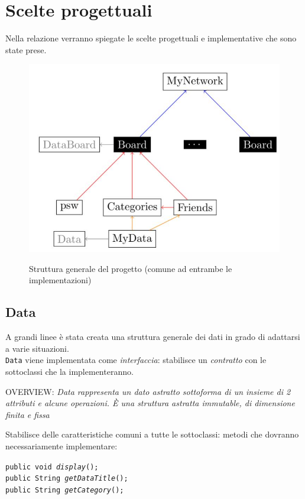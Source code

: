 \documentclass[10pt, a4paper]{article}
\begin{document}
\clearpage

\section{Scelte progettuali}
Nella relazione verranno spiegate le scelte progettuali e implementative che sono state prese.

\begin{figure}[h!]
	\centering
	\includegraphics[scale=0.4]{diag1}
	\label{fig:diag1}
	\caption{Struttura generale del progetto (comune ad entrambe le implementazioni)}
\end{figure}

\subsection{Data}
A grandi linee è stata creata una struttura generale dei dati in grado di adattarsi a varie situazioni.\\ \texttt{Data} viene implementata come \textit{interfaccia}: stabilisce un \textit{contratto} con le sottoclassi che la implementeranno. 
\begin{center}
OVERVIEW: \textit{Data rappresenta un dato astratto sottoforma di un insieme di 2 attributi e alcune operazioni. È una struttura astratta immutable, di dimensione finita e fissa}
\end{center}
Stabilisce delle caratteristiche comuni a tutte le sottoclassi: metodi che dovranno necessariamente implementare: 
\begin{center}
\texttt{public void \emph{display}();\\public String \emph{getDataTitle}();\\public 		String \emph{getCategory}();}
\end{center}
\end{document}
